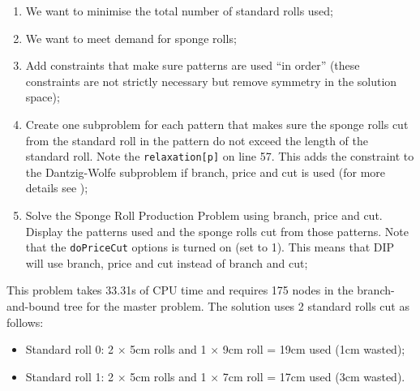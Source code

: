 \begin{enumerate}
\item We want to minimise the total number of standard rolls used;


\item We want to meet demand for sponge rolls;


\item Add constraints that make sure patterns are used ``in order'' (these constraints are not strictly necessary but remove symmetry in the solution space);


\item Create one subproblem for each pattern that makes sure the sponge rolls cut from the standard roll in the pattern do not exceed the length of the standard roll. Note the \texttt{relaxation[p]} on line 57. This adds the constraint to the Dantzig-Wolfe subproblem if branch, price and cut is used (for more details see );


\item Solve the Sponge Roll Production Problem using branch, price and cut.  Display the patterns used and the sponge rolls cut from those patterns. Note that the \texttt{doPriceCut} options is turned on (set to 1). This means that \ac{DIP} will use branch, price and cut instead of branch and cut;


\end{enumerate}

This problem takes 33.31s of CPU time and requires 175 nodes in the branch-and-bound tree for the master problem. The solution uses 2 standard rolls cut as follows:
\begin{itemize}
\item Standard roll 0: 2 $\times$ 5cm rolls and 1 $\times$ 9cm roll = 19cm used (1cm wasted);
\item Standard roll 1: 2 $\times$ 5cm rolls and 1 $\times$ 7cm roll = 17cm used (3cm wasted).
\end{itemize}
